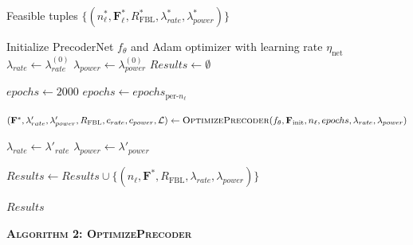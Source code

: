 \documentclass[a4paper, 12pt, onecolumn, journal, twoside, draftclsnofoot]{IEEEtran}
\begin{document}
\begin{algorithmic}[1]

\Ensure
Feasible tuples
$\{(n_\ell^*, \mathbf{F}_\ell^*, R_{\mathrm{FBL}}^*,
\lambda_{rate}^*, \lambda_{power}^*)\}$

\State Initialize PrecoderNet $f_\theta$ and Adam optimizer with learning rate $\eta_{\text{net}}$
\State $\lambda_{rate} \gets \lambda_{rate}^{(0)}$
\State $\lambda_{power} \gets \lambda_{power}^{(0)}$
\State $Results \gets \emptyset$


        \State $epochs \gets 2000$ 
    \Else
        \State $epochs \gets epochs_{\text{per-}n_\ell}$
    \EndIf

    \State
    $(\mathbf{F}^*,
    \lambda'_{rate},
    \lambda'_{power},
    R_{\mathrm{FBL}},
    c_{rate},
    c_{power},
    \mathcal{L})
    \gets
    \textsc{OptimizePrecoder}(f_\theta,
    \mathbf{F}_{\mathrm{init}},
    n_\ell,
    epochs,
    \lambda_{rate},
    \lambda_{power})$

    \State $\lambda_{rate} \gets \lambda'_{rate}$
    \State $\lambda_{power} \gets \lambda'_{power}$


        \State
        $Results \gets Results \cup
        \{(n_\ell, \mathbf{F}^*, R_{\mathrm{FBL}},
        \lambda_{rate}, \lambda_{power})\}$
    \EndIf

\EndFor
\State \Return $Results$
\end{algorithmic}

\newpage

\noindent\textbf{\textsc{Algorithm 2: OptimizePrecoder}}
\end{document}
